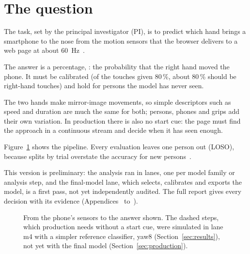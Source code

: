 \section{The question}\label{sec:question}
The task, set by the principal investigator (PI), is to predict which hand brings a smartphone to the nose from the
motion sensors that the browser delivers to a web page at about 60~Hz~\cite{w3c2025deviceorientation}.

The answer is a percentage, \pright{}: the probability that the right hand moved the phone. It must be calibrated
(of the touches given 80\,\%, about 80\,\% should be right-hand touches) and hold for persons the model has never
seen.

The two hands make mirror-image movements, so simple descriptors such as speed and duration are much the same for
both; persons, phones and grips add their own variation. In production there is also no start cue: the page must
find the approach in a continuous stream and decide when it has seen enough.

Figure~\ref{fig:pipeline} shows the pipeline. Every evaluation leaves one person out (LOSO), because splits by
trial overstate the accuracy for new persons~\cite{saeb2017usecase}.

This version is preliminary: the analysis ran in lanes, one per model family or analysis step, and the final-model
lane, which selects, calibrates and exports the model, is a first pass, not yet independently audited. The full
report gives every decision with its evidence (Appendices~ to~).

\begin{figure}[tbp]
\centering

\caption{From the phone's sensors to the answer shown. The dashed steps, which production needs without a start
cue, were simulated in lane m4 with a simpler reference classifier, yaw8 (Section~\ref{sec:results}), not yet with
the final model (Section~\ref{sec:production}).}
\label{fig:pipeline}
\end{figure}
